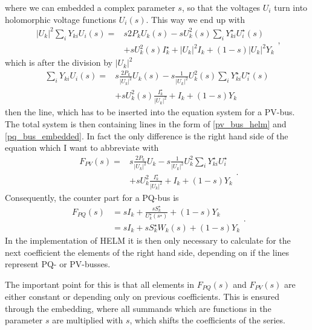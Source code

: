where we can embedded a complex parameter $s$, so that the voltages $U_i$ turn into holomorphic voltage functions $U_i(s)$. This way we end up with
\begin{equation}
	\begin{split}
		|U_k|^2 \sum_i Y_{ki} U_i(s) = 
			& s 2 P_k U_k(s) - s U_k^2(s) \sum_i Y_{ki}^\star U_i^\star(s) \\
			& + s U_k^2(s) I_k^\star + |U_k|^2 I_k + (1 - s) |U_k|^2 Y_k
	\end{split},
\end{equation}
which is after the division by $|U_k|^2$
\begin{equation}
	\begin{split}
		\sum_i Y_{ki} U_i(s) = 
			& s \frac{2 P_k}{|U_k|^2} U_k(s) - s \frac{1}{|U_k|^2} U_k^2(s) \sum_i Y_{ki}^\star U_i^\star(s) \\
			& + s U_k^2(s) \frac{I_k^\star}{|U_k|^2} + I_k + (1 - s) Y_k
	\end{split}
	\label{eq:pv_bus_helm}
\end{equation}
then the line, which has to be inserted into the equation system for a PV-bus. The total system is then containing lines in the form of \eqref{pv_bus_helm} and \eqref{pq_bus_embedded}. In fact the only difference is the right hand side of the equation which I want to abbreviate with
\begin{equation}
	\begin{split}
		F_{PV}(s) = 
			& s \frac{2 P_k}{|U_k|^2} U_k - s \frac{1}{|U_k|^2} U_k^2 \sum_i Y_{ki}^\star U_i^\star \\
			& + s U_k^2 \frac{I_k^\star}{|U_k|^2} + I_k + (1 - s) Y_k
	\end{split}.
	\label{eq:rhs_pv}
\end{equation}
Consequently, the counter part for a PQ-bus is
\begin{equation}
	\begin{split}
		F_{PQ}(s) 	& = s I_k + \frac{s S_k^\star}{U_k^\star(s^\star)} + (1 - s) Y_k \\
				& = s I_k + s S_k^\star W_k(s) + (1 - s) Y_k
	\end{split}.
	\label{eq:rhs_pq}
\end{equation}
In the implementation of HELM it is then only necessary to calculate for the next coefficient the elements of the right hand side, depending on if the lines represent PQ- or PV-busses.

The important point for this is that all elements in $F_{PQ}(s)$ and $F_{PV}(s)$ are either constant or depending only on previous coefficients. This is ensured through the embedding, where all summands which are functions in the parameter $s$ are multiplied with $s$, which shifts the coefficients of the series.

